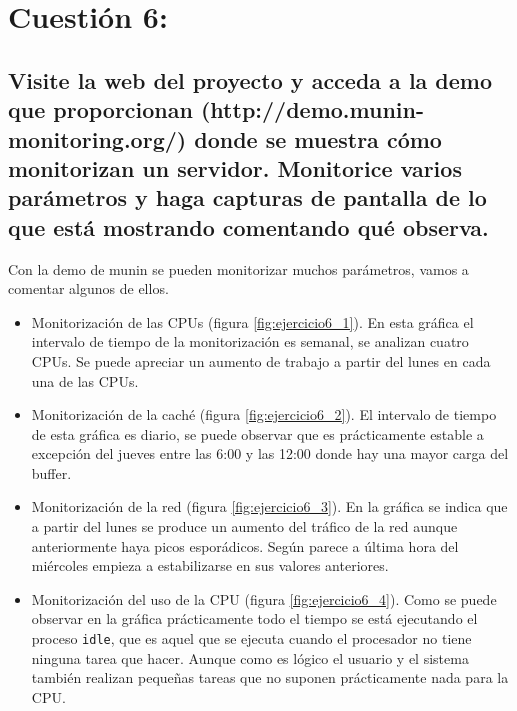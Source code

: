 \section{Cuestión 6:}
 
\subsection{Visite la web del proyecto y acceda a la demo que proporcionan (http://demo.munin-monitoring.org/) donde se muestra cómo monitorizan un servidor. Monitorice varios parámetros y haga capturas de pantalla de lo que está mostrando comentando qué observa.}

Con la demo de munin se pueden monitorizar muchos parámetros, vamos a comentar algunos de ellos.

\begin{itemize}
	\item Monitorización de las CPUs (figura \ref{fig:ejercicio6_1}). En esta gráfica el intervalo de tiempo de la monitorización es semanal, se analizan cuatro CPUs. Se puede apreciar un aumento de trabajo a partir del lunes en cada una de las CPUs.
	\item Monitorización de la caché (figura \ref{fig:ejercicio6_2}). El intervalo de tiempo de esta gráfica es diario, se puede observar que es prácticamente estable a excepción del jueves entre las 6:00 y las 12:00 donde hay una mayor carga del buffer.
	\item Monitorización de la red (figura \ref{fig:ejercicio6_3}). En la gráfica se indica que a partir del lunes se produce un aumento del tráfico de la red aunque anteriormente haya picos esporádicos. Según parece a última hora del miércoles empieza a estabilizarse en sus valores anteriores. 
	\item Monitorización del uso de la CPU (figura \ref{fig:ejercicio6_4}). Como se puede observar en la gráfica prácticamente todo el tiempo se está ejecutando el proceso \texttt{idle}, que es aquel que se ejecuta cuando el procesador no tiene ninguna tarea que hacer. Aunque como es lógico el usuario y el sistema también realizan pequeñas tareas que no suponen prácticamente nada para la CPU.
\end{itemize}

